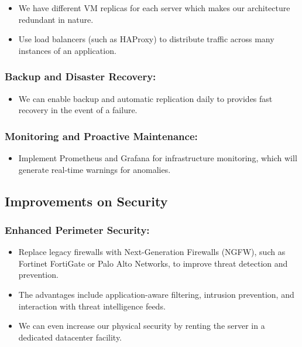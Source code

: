 \documentclass{llncs}
\begin{document}
\begin{itemize}
  \item We have different VM replicas for each server which makes our architecture redundant in nature.
  \item Use load balancers (such as HAProxy) to distribute traffic across many instances of an application.
\end{itemize}

\subsubsection{Backup and Disaster Recovery:}

\begin{itemize}
  \item We can enable backup and automatic replication daily to provides fast recovery in the event of a failure.
\end{itemize}

\subsubsection{Monitoring and Proactive Maintenance:}

\begin{itemize}
  \item Implement Prometheus and Grafana for infrastructure monitoring, which will generate real-time warnings for anomalies.
        
\end{itemize}

\subsection{Improvements on Security}

\subsubsection{Enhanced Perimeter Security:}

\begin{itemize}
  \item Replace legacy firewalls with Next-Generation Firewalls (NGFW), such as Fortinet FortiGate or Palo Alto Networks, to improve threat detection and prevention.
  \item The advantages include application-aware filtering, intrusion prevention, and interaction with threat intelligence feeds.
  \item We can even increase our physical security by renting the server in a dedicated datacenter facility.
\end{itemize}
\end{document}
